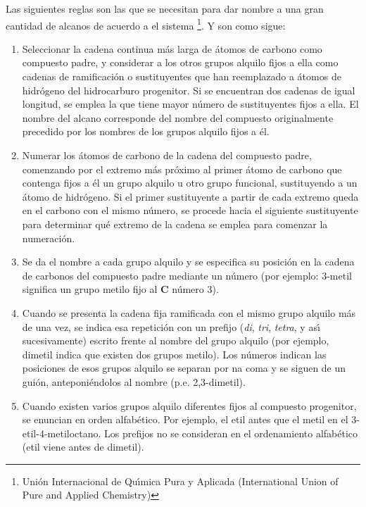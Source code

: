 Las siguientes reglas son las que se necesitan para dar
nombre a una gran cantidad de alcanos de acuerdo a el sistema
 \footnote{Uni\'on Internacional de Qu\'{\i}mica Pura y Aplicada (International Union of Pure and Applied Chemistry)}. Y
son como sigue:
\begin{enumerate}
\item Seleccionar la cadena continua m\'as larga de \'atomos de carbono como compuesto
padre, y considerar a los otros grupos alquilo fijos a ella como cadenas de
ramificaci\'on o sustituyentes que han reemplazado a \'atomos de hidr\'ogeno del
hidrocarburo progenitor. Si se encuentran dos cadenas de igual longitud, se emplea la
que tiene mayor n\'umero de sustituyentes fijos a ella. El nombre del alcano
corresponde del nombre del compuesto originalmente precedido por los nombres de los
grupos alquilo fijos a \'el.
\item Numerar los \'atomos de carbono de la cadena del compuesto padre, comenzando por el
extremo m\'as pr\'oximo al primer \'atomo de carbono que contenga fijos a \'el un grupo
alquilo u otro grupo funcional, sustituyendo a  un \'atomo de hidr\'ogeno. Si el primer
sustituyente a partir de cada extremo queda en el carbono con el mismo n\'umero, se
procede hacia el siguiente sustituyente para determinar qu\'e extremo de la cadena se
emplea para comenzar la numeraci\'on.
\item Se da el nombre a cada grupo alquilo y se especifica su posici\'on en la cadena
de carbonos del compuesto padre mediante un n\'umero (por ejemplo: 3-metil significa un
grupo metilo fijo al \textbf{C} n\'umero 3).
\item Cuando se presenta la cadena fija ramificada con el mismo grupo  alquilo m\'as de
una vez, se indica esa repetici\'on con un prefijo (\textit{di}, \textit{tri},
\textit{tetra}, y as\'{\i} sucesivamente) escrito frente  al nombre del grupo alquilo
(por ejemplo, dimetil indica que existen dos grupos metilo).  Los n\'umeros indican las
posiciones de esos grupos alquilo se separan por na coma y se siguen de un gui\'on,
anteponi\'endolos al nombre (p.e. 2,3-dimetil).
\item Cuando existen varios grupos alquilo diferentes fijos al compuesto progenitor, se
enuncian en orden alfab\'etico. Por ejemplo, el etil antes que el metil en el
3-etil-4-metiloctano. Los prefijos no se consideran en el ordenamiento alfab\'etico
(etil viene antes de dimetil).
\end{enumerate}

